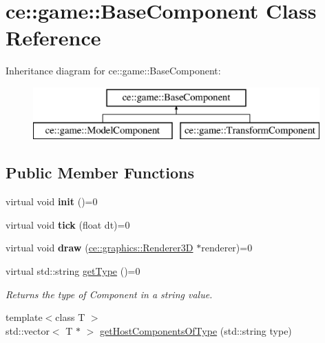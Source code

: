 \hypertarget{classce_1_1game_1_1_base_component}{}\section{ce\+:\+:game\+:\+:Base\+Component Class Reference}
\label{classce_1_1game_1_1_base_component}
Inheritance diagram for ce\+:\+:game\+:\+:Base\+Component\+:\begin{figure}[H]
\begin{center}
\leavevmode
\includegraphics[height=2.000000cm]{classce_1_1game_1_1_base_component}
\end{center}
\end{figure}
\subsection*{Public Member Functions}
\begin{DoxyCompactItemize}
\item 
\mbox{\label{classce_1_1game_1_1_base_component_a0b5c620c6b665489b5665621aba17935}} 
virtual void {\bfseries init} ()=0
\item 
\mbox{\label{classce_1_1game_1_1_base_component_a0a1cda211f84337d2a33937f89aebd6b}} 
virtual void {\bfseries tick} (float dt)=0
\item 
\mbox{\label{classce_1_1game_1_1_base_component_a98da3e6c0af1e20f050ff06749c1299b}} 
virtual void {\bfseries draw} (\hyperlink{classce_1_1graphics_1_1_renderer3_d}{ce\+::graphics\+::\+Renderer3D} $\ast$renderer)=0
\item 
virtual std\+::string \hyperlink{classce_1_1game_1_1_base_component_a1022b55c1926a019a2b3a71fb6b9150e}{get\+Type} ()=0
\begin{DoxyCompactList}\small\item\em Returns the type of Component in a string value. \end{DoxyCompactList}\item 
{\footnotesize template$<$class T $>$ }\\std\+::vector$<$ T $\ast$ $>$ \hyperlink{classce_1_1game_1_1_base_component_af359b12ae4a497e9b36f08286a3849dc}{get\+Host\+Components\+Of\+Type} (std\+::string type)
\end{DoxyCompactItemize}
